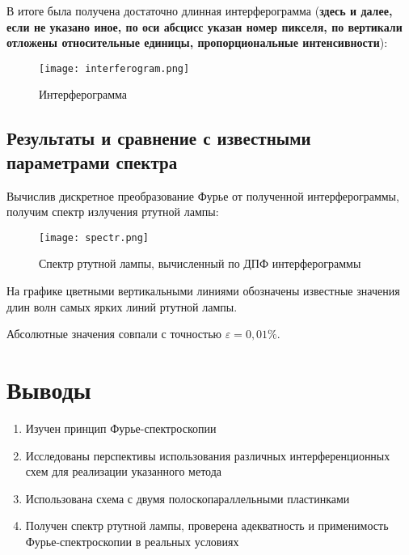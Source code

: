 \documentclass{urticle}
\begin{document}
  
	
	
	В итоге была получена достаточно длинная интерферограмма (\textbf{здесь и далее, если не указано иное, по оси абсцисс указан номер пикселя, по вертикали отложены относительные единицы, пропорциональные интенсивности}):
	\begin{figure}[H]
	\centering
  	\texttt{[image: interferogram.png]}
  \caption{Интерферограмма}
\end{figure}

\newpage
	\subsection*{Результаты и сравнение с известными параметрами спектра}
	
	Вычислив дискретное преобразование Фурье от полученной интерферограммы, получим спектр излучения ртутной лампы:
	
	\begin{figure}[H]
	\centering
  	\texttt{[image: spectr.png]}
  \caption{Спектр ртутной лампы, вычисленный по ДПФ интерферограммы}
  \end{figure}
  На графике цветными вертикальными линиями обозначены известные значения длин волн самых ярких линий ртутной лампы.
  
  Абсолютные значения совпали с точностью $\varepsilon = 0,01\%$.

	
\section*{Выводы}
\begin{enumerate}
    \setcounter{enumi}{0}
	\item Изучен принцип Фурье-спектроскопии
	\item Исследованы перспективы использования различных интерференционных схем для реализации указанного метода
	\item Использована схема с двумя полоскопараллельными пластинками
	\item Получен спектр ртутной лампы, проверена адекватность и применимость Фурье-спектроскопии в реальных условиях
\end{enumerate}
\end{document}
